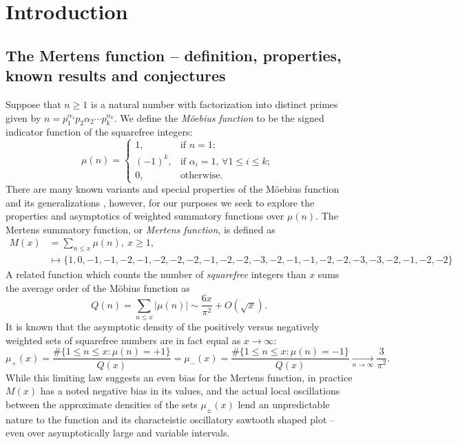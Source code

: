 \documentclass[11pt,reqno,a4letter]{article}
\numberwithin{figure}{section}
\numberwithin{table}{section}
\newcommand{\cf}{\textit{cf.\ }}
\theoremstyle{plain}
\numberwithin{theorem}{section}
\theoremstyle{definition}
\begin{document}
\newpage
\section{Introduction} 


\subsection{The Mertens function -- definition, properties, known results and conjectures} 
\label{subSection_MertensMxClassical_Intro} 

Suppose that $n \geq 1$ is a natural number with factorization into 
distinct primes given by 
$n = p_1^{\alpha_1} p_2{\alpha_2} \cdots p_k^{\alpha_k}$. 
We define the \emph{M\"oebius function} to be the signed indicator function 
of the squarefree integers: 
\[
\mu(n) = \begin{cases} 
     1, & \text{if $n = 1$; } \\ 
     (-1)^k, & \text{if $\alpha_i = 1$, $\forall 1 \leq i \leq k$; } \\ 
     0, & \text{otherwise.} 
     \end{cases} 
\]
There are many known variants and special properties of the M\"oebius function 
and its generalizations \cite[\cf \S 2]{HANDBOOKNT-2004}, however, for our 
purposes we seek to explore the properties and asymptotics of weighted 
summatory functions over $\mu(n)$. 
The Mertens summatory function, or \emph{Mertens function}, is defined as 
\begin{align*} 
M(x) & = \sum_{n \leq x} \mu(n),\ x \geq 1, \\ 
     & \longmapsto \{1, 0, -1, -1, -2, -1, -2, -2, -2, -1, -2, -2, -3, -2, 
     -1, -1, -2, -2, -3, -3, -2, -1, -2, -2\}
\end{align*} 
A related function which counts the 
number of \emph{squarefree} integers than $x$ sums the average order of the M\"obius function as 
\[ 
Q(n) = \sum_{n \leq x} |\mu(n)| \sim \frac{6x}{\pi^2} + O\left(\sqrt{x}\right). 
\] 
It is known that the asymptotic density of the positively versus negatively 
weighted sets of squarefree numbers are in fact equal as $x \rightarrow \infty$: 
\[
\mu_{+}(x) = \frac{\#\{1 \leq n \leq x: \mu(n) = +1\}}{Q(x)} = 
     \mu_{-}(x) = \frac{\#\{1 \leq n \leq x: \mu(n) = -1\}}{Q(x)} 
     \xrightarrow[n \rightarrow \infty]{} \frac{3}{\pi^2}. 
\]
While this limiting law suggests an even bias for the Mertens function, 
in practice $M(x)$ has a noted negative bias in its values, and the actual 
local oscillations between the approximate densities of the sets 
$\mu_{\pm}(x)$ lend an unpredictable nature to the function and its 
characteistic oscillatory sawtooth shaped plot -- even over asymptotically 
large and variable intervals.
\end{document}
